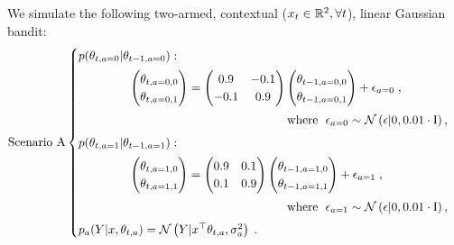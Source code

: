 We simulate the following two-armed, contextual ($x_t\in{\mathbb R}^2, \forall t$), linear Gaussian bandit:
\begin{equation}
\text{Scenario A}
\begin{cases}
	\vspace*{1ex}
	p(\theta_{t,a=0}|\theta_{t-1,a=0}): \\ \vspace*{1ex}
	\hspace*{10ex}\begin{pmatrix}
	\theta_{t,a=0,0}\\
	\theta_{t,a=0,1}\\
	\end{pmatrix} = \begin{pmatrix}
	0.9 & -0.1 \\
	-0.1 & 0.9 \\
	\end{pmatrix} \begin{pmatrix}
	\theta_{t-1,a=0,0}\\
	\theta_{t-1,a=0,1}\\
	\end{pmatrix} + \epsilon_{a=0} \;, \\ \vspace*{1ex}
	\hspace*{40ex} \text{where } \;  \epsilon_{a=0} \sim \N{\epsilon|0,0.01 \cdot\mathrm{I}},\\
	
	\vspace*{1ex}
	p(\theta_{t,a=1}|\theta_{t-1,a=1}): \\ \vspace*{1ex}
	\hspace*{10ex}\begin{pmatrix}
	\theta_{t,a=1,0}\\
	\theta_{t,a=1,1}\\
	\end{pmatrix} = \begin{pmatrix}
	0.9 & 0.1 \\
	0.1 & 0.9 \\
	\end{pmatrix} \begin{pmatrix}
	\theta_{t-1,a=1,0}\\
	\theta_{t-1,a=1,1}\\
	\end{pmatrix} + \epsilon_{a=1} \;, \\ \vspace*{1ex}
	\hspace*{40ex} \text{where } \;  \epsilon_{a=1} \sim \N{\epsilon|0,0.01 \cdot\mathrm{I}},\\
	
	p_a(Y|x,\theta_{t,a})=\N{Y|x^\top \theta_{t,a}, \sigma_a^2} \;.
\end{cases}
\label{eq:linear_mixing_dynamics_a}
\end{equation}

